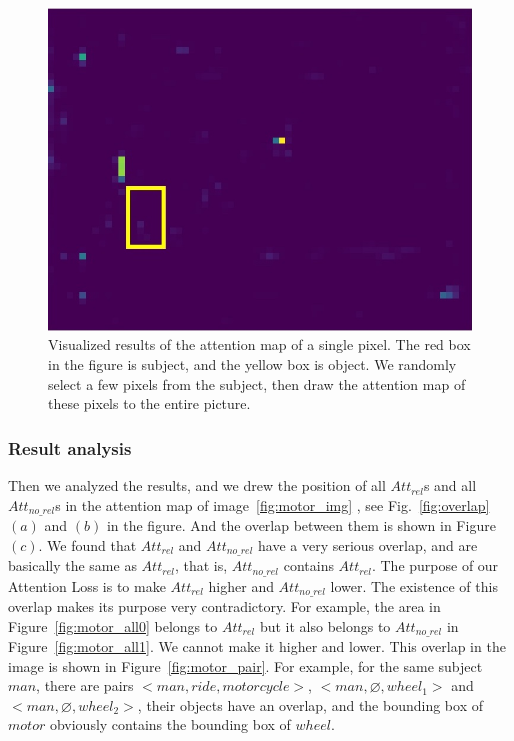 \begin{figure}[h!]
{\begin{minipage}[t]{3.5cm}
		\end{minipage}
		\begin{minipage}[t]{3.5cm}
			\centering
			\includegraphics[width=0.9\linewidth]{figures/pixel/map5_3}
	\end{minipage}}
	
	\caption[Visualized results of the attention map of a single pixel ]{Visualized results of the attention map of a single pixel. The red box in the figure is subject, and the yellow box is object. We randomly select a few pixels from the subject, then draw the attention map of these pixels to the entire picture. }
	\label{fig:pixel}
\end{figure}

\subsubsection{Result analysis}

Then we analyzed the results, and we drew the position of all $ Att_{rel} $s and all $ Att_{no\_rel} $s in the attention map of image~\ref{fig:motor_img} , see Fig.~\ref{fig:overlap} $ (a) $ and $ (b) $ in the figure. And the overlap between them is shown in Figure $ (c). $ We found that $ Att_{rel }$ and $ Att_{no\_rel} $ have a very serious overlap, and are basically the same as $ Att_{rel }$, that is,  $ Att_{no\_rel} $ contains $ Att_{rel }$. The purpose of our Attention Loss is to make $ Att_{rel }$ higher and $ Att_{no\_rel }$ lower. The existence of this overlap makes its purpose very contradictory. For example, the area in Figure~\ref{fig:motor_all0} belongs to $ Att_{rel }$ but it also belongs to $ Att_{no\_rel }$ in Figure~\ref{fig:motor_all1}. We cannot make it higher and lower. This overlap in the image is shown in Figure~\ref{fig:motor_pair}. For example, for the same subject $ man $, there are  pairs $<man,ride,motorcycle>$, $ <man, \varnothing, wheel_1> $  and  $ <man, \varnothing, wheel_2>  $, their objects have an overlap, and the bounding box  of $ motor $ obviously contains the bounding box of  $ wheel $.

